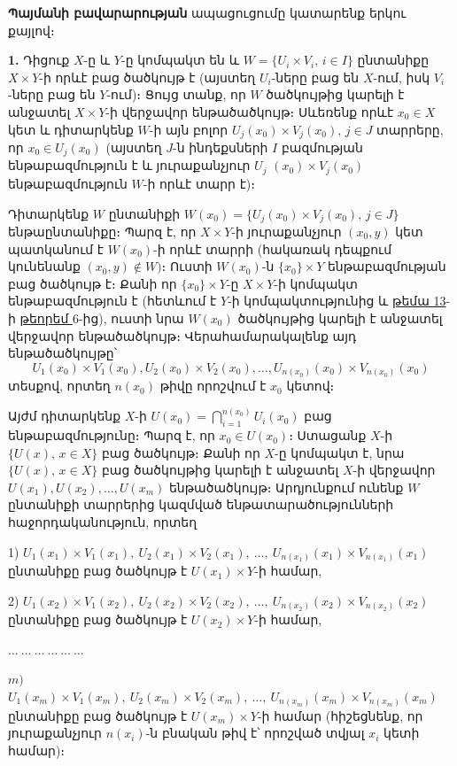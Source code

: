 \documentclass[./main.tex]{subfiles}
\begin{document}
\begin{varproof}
\textbf{Պայմանի բավարարության} ապացուցումը կատարենք երկու քայլով։

\par \textbf{1.} Դիցուք $X$-ը և $Y$-ը կոմպակտ են և $W=\{ U_i\times V_i,\, i\in I\}$ ընտանիքը $X\times Y$-ի որևէ բաց ծածկույթ է (այստեղ $U_i$-ները բաց են $X$-ում, իսկ $V_i$-ները բաց են $Y$-ում)։ Ցույց տանք, որ $W$ ծածկույթից կարելի է անջատել $X\times Y$-ի վերջավոր ենթածածկույթ։ Սևեռենք որևէ $x_0\in X$ կետ և դիտարկենք $W$-ի այն բոլոր $U_j (x_0) \times V_j (x_0 ),\, j\in J$ տարրերը, որ $x_0\in U_j (x_0)$ (այստեղ $J$-ն ինդեքսների $I$ բազմության ենթաբազմություն է և յուրաքանչյուր $U_j$ $(x_0)\times V_j(x_0)$ ենթաբազմություն $W$-ի որևէ տարր է)։ 
\par Դիտարկենք $W$ ընտանիքի $W(x_0)=\{ U_j (x_0 )\times V_j (x_0 ),\, j\in J\}$ ենթաընտանիքը։ Պարզ է, որ $X\times Y$-ի յուրաքանչյուր $(x_0,y)$ կետ պատկանում է $W(x_0)$-ի որևէ տարրի (հակառակ դեպքում կունենանք $(x_0,y)\notin W)$։ Ուստի $W(x_0)$-ն $\{ x_0\} \times Y$ ենթաբազ\-մութ\-յան բաց ծածկույթ է։ Քանի որ $\{x_0\}\times Y$-ը $X\times Y$-ի կոմպակտ ենթաբազմություն է (հետևում է $Y$-ի կոմպակտությունից և \hyperlink{sec:13}{թեմա 13}-ի \hyperref[ch13thm6]{թեորեմ $6$}-ից), ուստի նրա $W(x_0)$ ծածկույթից կարելի է անջատել վերջավոր են\-թա\-ծած\-կույթ։ Վերահամարակալենք այդ ենթածածկույթը՝
\[ U_1 (x_0)\times V_1 (x_0), U_2 (x_0)\times V_2 (x_0),\dots,U_{n(x_0)} (x_0)\times V_{n(x_0)}(x_0)\]
տեսքով, որտեղ $n(x_0)$ թիվը որոշվում է $x_0$ կետով։
\par Այժմ դիտարկենք $X$-ի $U(x_0)=\bigcap\limits_{i=1}^{n(x_0)}U_i(x_0)$ բաց ենթաբազմությունը։ Պարզ է, որ $x_0\in U(x_0 )$։ Ստացանք $X$-ի $\{ U(x),\, x\in X\}$ բաց ծածկույթ։ Քանի որ $X$-ը կոմպակտ է, նրա $\{U(x),\, x\in X\}$ բաց ծածկույթից կարելի է անջատել $X$-ի վերջավոր $U(x_1),U(x_2),\dots,U(x_m)$ ենթածածկույթ։ Արդյունքում ունենք $W$ ընտանիքի տար\-րե\-րից կազմված ենթատարածությունների հաջորդականություն, որտեղ
\par
1) $U_1 (x_1)\times V_1(x_1),\ U_2 (x_1)\times V_2(x_1 ),\ \dots,\ U_{n(x_1)}(x_1)\times V_{n(x_1)} (x_1)$ ընտանիքը բաց ծածկույթ է $U(x_1)\times Y$-ի համար,\par 2)
$U_1(x_2)\times V_1 (x_2),\ U_2(x_2 )\times V_2(x_2 ),\ \dots,\ U_{n(x_2)} (x_2)\times V_{n(x_2)} (x_2)$ ընտանիքը բաց ծածկույթ է $U(x_2)\times Y$-ի համար,\par
$\dots\ \dots\ \dots\ \dots\ \dots\ \dots\ $ \par $m)$
$U_1 (x_m)\times V_1(x_m),\ U_2 (x_m )\times V_2(x_m),\ \dots,\ U_{n(x_m)} (x_m)\times V_{n(x_m)}(x_m)$ ընտանիքը բաց ծածկույթ է $U(x_m)\times Y$-ի համար (հիշեցնենք, որ յուրաքանչյուր $n(x_i)$-ն բնա\-կան թիվ է՝ որոշված տվյալ $x_i$ կետի համար)։


\end{varproof}
\end{document}
